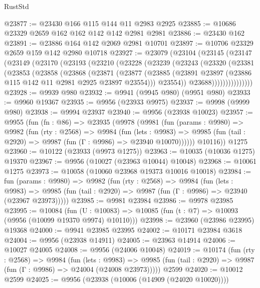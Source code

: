 \begin{lexlean}{RustStd}
\begin{coremodule}
@23877 := @23430 @166 @115 @144 @11 @2983 @2925
@23885 := @10686 @23329 @2659 @162 @162 @142 @142 @2981 @2981
@23886 := @23430 @162
@23891 := @23886 @164 @142 @2069 @2981 @10701
@23897 := @10706 @23329 @2659 @159 @142 @2980 @10718
@23927 := @23079
    (@23104
      (@23145
        (@23147
          (@23149
            (@23170
              (@23193
                (@23210
                  (@23228
                    (@23239
                      (@23243
                        (@23320
                          (@23381
                            (@23853
                              (@23858
                                (@23868
                                  (@23871
                                    (@23877
                                      (@23885
                                        (@23891
                                          @23897
                                          (@23886 @115 @142 @11 @2981 @2925 @23897 @23554)))
                                      @23554))
                                  @23688)))))))))))))))
@23928 := @9939 @980
@23932 := @9941 (@9945 @980) (@9951 @980)
@23933 := @9960 @19367
@23935 := @9956 (@23933 @9975)
@23937 := @9998 (@9999 @980)
@23938 := @9994 @23937
@23940 := @9956 (@23938 @10023)
@23957 := @9955
    (fun (fn : @86) =>
    @23935
      (@9978
        (@9981
          (fun (params : @9980) =>
          @9982
            (fun (rty : @2568) =>
            @9984
              (fun (lets : @9983) =>
              @9985 (fun (tail : @2920) => @9987 (fun (Γ : @9986) => @23940 @10070))))))
        @10116))
    @1275
@23960 := @10122 (@23933 (@9973 @1275))
@23963 := @10035 (@10036 @1275) @19370
@23967 := @9956 (@10027 (@23963 @10044) @10048)
@23968 := @10061 @1275
@23973 := @10058 (@10060 @23968 @19373 @10016 @10018)
@23984 := fun (params : @9980) =>
  @9982
    (fun (rty : @2568) =>
    @9984
      (fun (lets : @9983) =>
      @9985 (fun (tail : @2920) => @9987 (fun (Γ : @9986) => @23940 (@23967 @23973)))))
@23985 := @9981 @23984
@23986 := @9978 @23985
@23995 := @10084
    (fun (U : @10083) => @10085 (fun (t : @7) => @10093 (@9956 (@10099 @19370 @9974) @10110)))
@23998 := @23960 (@23986 @23995) @19368
@24000 := @9941 @23985 @23995
@24002 := @10171 @23984 @3618
@24004 := @9956 (@23938 @14911)
@24005 := @23963 @14914
@24006 := @10027 @24005
@24008 := @9956 (@24006 @10048)
@24019 := @10174
    (fun (rty : @2568) =>
    @9984
      (fun (lets : @9983) =>
      @9985 (fun (tail : @2920) => @9987 (fun (Γ : @9986) => @24004 (@24008 @23973)))))
    @2599
@24020 := @10012 @2599
@24025 := @9956 (@23938 (@10006 (@14909 (@24020 @10020))))

\end{coremodule}
\end{lexlean}
